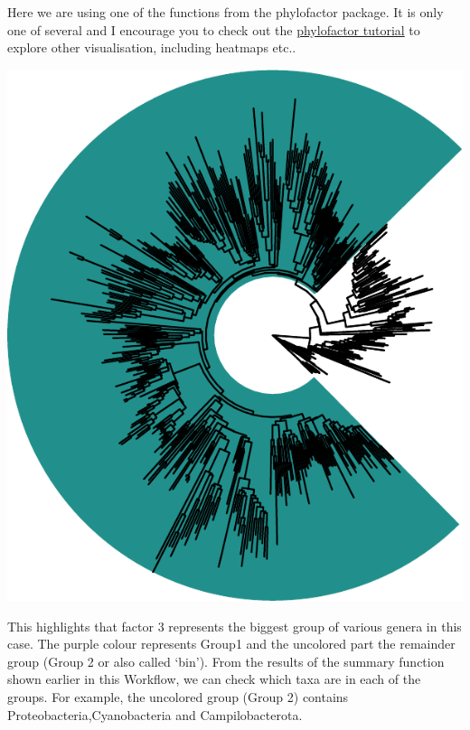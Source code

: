 \documentclass[
]{book}
\newenvironment{Shaded}{\begin{snugshade}}{\end{snugshade}}
\newcommand{\DecValTok}[1]{\textcolor[rgb]{0.00,0.00,0.81}{#1}}
\newcommand{\FunctionTok}[1]{\textcolor[rgb]{0.00,0.00,0.00}{#1}}
\newcommand{\NormalTok}[1]{#1}
\newcommand{\OtherTok}[1]{\textcolor[rgb]{0.56,0.35,0.01}{#1}}
\newcommand{\SpecialCharTok}[1]{\textcolor[rgb]{0.00,0.00,0.00}{#1}}
\begin{document}
Here we are using one of the functions from the phylofactor package. It is only one of several and I encourage you to check out the \href{https://docs.wixstatic.com/ugd/0119a1_099ae20df8424af9a38585dcebc0d45a.pdf}{phylofactor tutorial} to explore other visualisation, including heatmaps etc..

\begin{Shaded}
\end{Shaded}

\includegraphics{gitbook-demo_files/figure-latex/pfviz2-1.pdf}

This highlights that factor 3 represents the biggest group of various genera in this case. The purple colour represents Group1 and the uncolored part the remainder group (Group 2 or also called `bin'). From the results of the summary function shown earlier in this Workflow, we can check which taxa are in each of the groups. For example, the uncolored group (Group 2) contains Proteobacteria,Cyanobacteria and Campilobacterota.
\end{document}
